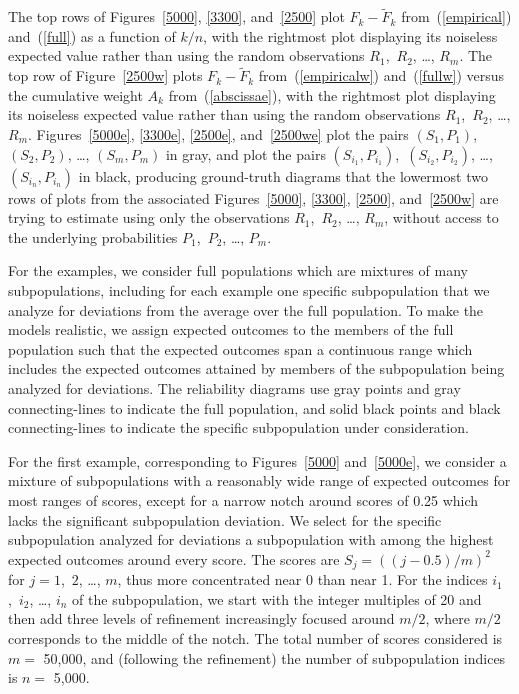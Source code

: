 \documentclass{article}
\begin{document}
The top rows of Figures~\ref{5000}, \ref{3300}, and~\ref{2500} plot
$F_k-\tilde{F}_k$ from~(\ref{empirical}) and~(\ref{full}) as a function
of $k/n$, with the rightmost plot displaying its noiseless expected value
rather than using the random observations $R_1$,~$R_2$, \dots, $R_m$.
The top row of Figure~\ref{2500w} plots $F_k-\tilde{F}_k$
from~(\ref{empiricalw}) and~(\ref{fullw}) versus
the cumulative weight $A_k$ from~(\ref{abscissae}),
with the rightmost plot displaying its noiseless expected value
rather than using the random observations $R_1$,~$R_2$, \dots, $R_m$.
Figures~\ref{5000e}, \ref{3300e}, \ref{2500e}, and~\ref{2500we} plot the pairs
$(S_1, P_1)$,~$(S_2, P_2)$, \dots, $(S_m, P_m)$ in gray, and plot the pairs
$(S_{i_1}, P_{i_1})$,~$(S_{i_2}, P_{i_2})$, \dots, $(S_{i_n}, P_{i_n})$
in black, producing ground-truth diagrams that the lowermost two rows of plots
from the associated Figures~\ref{5000}, \ref{3300}, \ref{2500}, and~\ref{2500w}
are trying to estimate using only the observations $R_1$,~$R_2$, \dots, $R_m$,
without access to the underlying probabilities $P_1$,~$P_2$, \dots, $P_m$.

For the examples, we consider full populations which are mixtures
of many subpopulations, including for each example one specific subpopulation
that we analyze for deviations from the average over the full population.
To make the models realistic, we assign expected outcomes to the members
of the full population such that the expected outcomes span a continuous range
which includes the expected outcomes attained by members of the subpopulation
being analyzed for deviations. The reliability diagrams use gray points
and gray connecting-lines to indicate the full population,
and solid black points and black connecting-lines to indicate
the specific subpopulation under consideration.

For the first example, corresponding to Figures~\ref{5000} and~\ref{5000e},
we consider a mixture of subpopulations with a reasonably wide range
of expected outcomes for most ranges of scores, except for a narrow notch
around scores of 0.25 which lacks the significant subpopulation deviation.
We select for the specific subpopulation analyzed for deviations
a subpopulation with among the highest expected outcomes around every score.
The scores are $S_j = ((j - 0.5) / m)^2$ for $j = 1$,~$2$, \dots, $m$,
thus more concentrated near 0 than near 1.
For the indices $i_1$,~$i_2$, \dots, $i_n$ of the subpopulation, we start
with the integer multiples of 20 and then add three levels of refinement
increasingly focused around $m/2$,
where $m/2$ corresponds to the middle of the notch.
The total number of scores considered is $m =$ 50,000, and
(following the refinement) the number of subpopulation indices is $n =$ 5,000.
\end{document}
